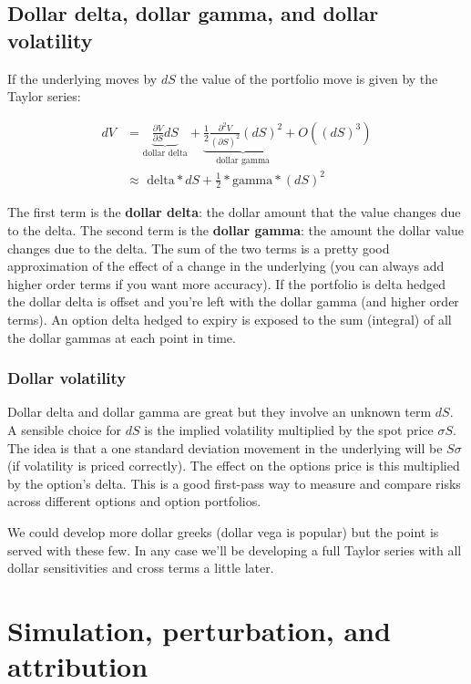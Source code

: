 \subsection{Dollar delta, dollar gamma, and dollar volatility}

If the underlying moves by $dS$ the value of the portfolio move is given by the Taylor series:

\begin{eqnarray*}
dV &= \underbrace{\frac{\partial V}{\partial S}dS}_{\mbox{dollar delta}} + \underbrace{\frac{1}{2}\frac{\partial^2 V}{(\partial S)^2 }(dS)^2}_{\mbox{dollar gamma}} + O((dS)^3) \\
 &\approx \mbox{ delta}*dS + \frac{1}{2}*\mbox{gamma}*(dS)^2
 \end{eqnarray*}

The first term is the \textbf{dollar delta}: the dollar amount that the value changes due to the delta. The second term is the \textbf{dollar gamma}: the amount the dollar value changes due to the delta. The sum of the two terms is a pretty good approximation of the effect of a change in the underlying (you can always add higher order terms if you want more accuracy). If the portfolio is delta hedged the dollar delta is offset and you're left with the dollar gamma (and higher order terms).  An option delta hedged to expiry is exposed  to the sum (integral) of all the dollar gammas at each point in time.

\subsubsection{Dollar volatility}
Dollar delta and dollar gamma are great but they involve an unknown term $dS$.  A sensible choice for $dS$  is the implied volatility multiplied by the spot price $ \sigma S$. The idea is that a one standard deviation movement in the underlying will be $S\sigma$ (if volatility is priced correctly). The effect on the options price is this multiplied by the option's delta. This is a good first-pass way to measure and compare risks across different options and option portfolios. 

We could develop more dollar greeks (dollar vega is popular) but the point is served with these few. In any case we'll be developing a full Taylor series with all dollar sensitivities and cross terms a little later. 

\section{Simulation, perturbation, and attribution}

